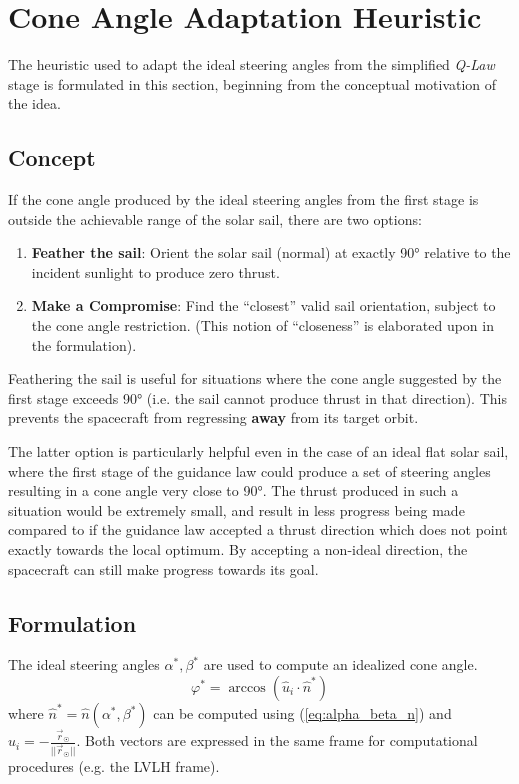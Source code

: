 \section{Cone Angle Adaptation Heuristic}
The heuristic used to adapt the ideal steering angles from the simplified \textit{Q-Law} stage is formulated in this section, beginning from the conceptual motivation of the idea.

\subsection{Concept}
If the cone angle produced by the ideal steering angles from the first stage is outside the achievable range of the solar sail, there are two options:
\begin{enumerate}
  \setlength{\parskip}{2pt}
  \item \textbf{Feather the sail}: Orient the solar sail (normal) at exactly \ang{90} relative to the incident sunlight to produce zero thrust.
  \item \textbf{Make a Compromise}: Find the ``closest'' valid sail orientation, subject to the cone angle restriction. (This notion of ``closeness'' is elaborated upon in the formulation).
\end{enumerate}

Feathering the sail is useful for situations where the cone angle suggested by the first stage exceeds \ang{90} (i.e. the sail cannot produce thrust in that direction). This prevents the spacecraft from regressing \textbf{away} from its target orbit.

The latter option is particularly helpful even in the case of an ideal flat solar sail, where the first stage of the guidance law could produce a set of steering angles resulting in a cone angle very close to \ang{90}. The thrust produced in such a situation would be extremely small, and result in less progress being made compared to if the guidance law accepted a thrust direction which does not point exactly towards the local optimum. By accepting a non-ideal direction, the spacecraft can still make progress towards its goal.

\subsection{Formulation}
The ideal steering angles \(\alpha^*, \beta^*\) are used to compute an idealized cone angle.
\begin{equation}
  \varphi^* = \arccos(\hat{u}_i \cdot \hat{n}^*)
  \label{eq:cone_star}
\end{equation}
where \(\hat{n}^* = \hat{n}(\alpha^*, \beta^*)\) can be computed using (\ref{eq:alpha_beta_n}) and \(\hat{u}_i = -\frac{\vec{r}_{\astrosun}}{||\vec{r}_{\astrosun}||}\). Both vectors are expressed in the same frame for computational procedures (e.g. the LVLH frame).

